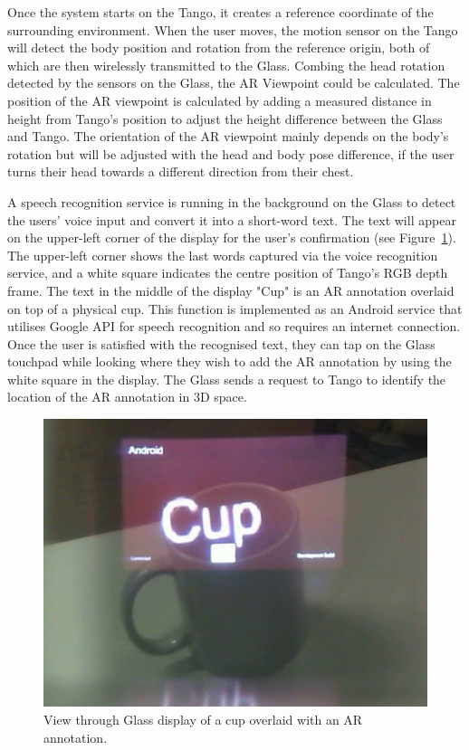 Once the system starts on the Tango, it creates a reference coordinate of the surrounding environment. When the user moves, the motion sensor on the Tango will detect the body position and rotation from the reference origin, both of which are then wirelessly transmitted to the Glass. Combing the head rotation detected by the sensors on the Glass, the AR Viewpoint could be calculated. The position of the AR viewpoint is calculated by adding a measured distance in height from Tango's position to adjust the height difference between the Glass and Tango. The orientation of the AR viewpoint mainly depends on the body's rotation but will be adjusted with the head and body pose difference, if the user turns their head towards a different direction from their chest. 

A speech recognition service is running in the background on the Glass to detect the users' voice input and convert it into a short-word text. The text will appear on the upper-left corner of the display for the user's confirmation (see Figure~\ref{fig:mgia15:ui}). The upper-left corner shows the last words captured via the voice recognition service, and a white square indicates the centre position of Tango's RGB depth frame. The text in the middle of the display "Cup" is an AR annotation overlaid on top of a physical cup. This function is implemented as an Android service that utilises Google API for speech recognition and so requires an internet connection. Once the user is satisfied with the recognised text, they can tap on the Glass touchpad while looking where they wish to add the AR annotation by using the white square in the display. The Glass sends a request to Tango to identify the location of the AR annotation in 3D space.

\begin{figure}
  \centering
  \includegraphics[width=0.6\linewidth]{images/62-3d-mgia15/WIN_20150614_204531_2.jpg}
  \caption{View through Glass display of a cup overlaid with an AR annotation.}
  \label{fig:mgia15:ui}
\end{figure}

